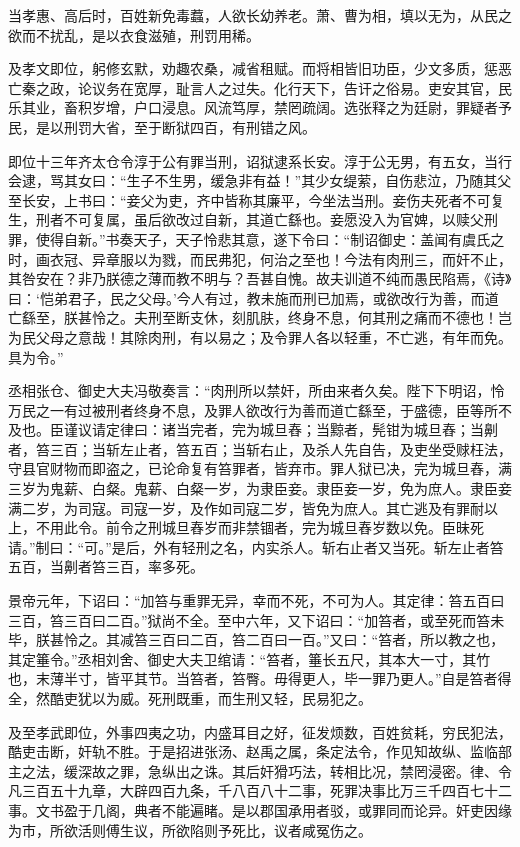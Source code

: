 \documentclass[12pt,UTF8]{ctexbook}
\begin{document}
当孝惠、高后时，百姓新免毒蠚，人欲长幼养老。萧、曹为相，填以无为，从民之欲而不扰乱，是以衣食滋殖，刑罚用稀。



及孝文即位，躬修玄默，劝趣农桑，减省租赋。而将相皆旧功臣，少文多质，惩恶亡秦之政，论议务在宽厚，耻言人之过失。化行天下，告讦之俗易。吏安其官，民乐其业，畜积岁增，户口浸息。风流笃厚，禁罔疏阔。选张释之为廷尉，罪疑者予民，是以刑罚大省，至于断狱四百，有刑错之风。



即位十三年齐太仓令淳于公有罪当刑，诏狱逮系长安。淳于公无男，有五女，当行会逮，骂其女曰：“生子不生男，缓急非有益！”其少女缇萦，自伤悲泣，乃随其父至长安，上书曰：“妾父为吏，齐中皆称其廉平，今坐法当刑。妾伤夫死者不可复生，刑者不可复属，虽后欲改过自新，其道亡繇也。妾愿没入为官婢，以赎父刑罪，使得自新。”书奏天子，天子怜悲其意，遂下令曰：“制诏御史：盖闻有虞氏之时，画衣冠、异章服以为戮，而民弗犯，何治之至也！今法有肉刑三，而奸不止，其咎安在？非乃朕德之薄而教不明与？吾甚自愧。故夫训道不纯而愚民陷焉，《诗》曰：‘恺弟君子，民之父母。’今人有过，教未施而刑已加焉，或欲改行为善，而道亡繇至，朕甚怜之。夫刑至断支休，刻肌肤，终身不息，何其刑之痛而不德也！岂为民父母之意哉！其除肉刑，有以易之；及令罪人各以轻重，不亡逃，有年而免。具为令。”



丞相张仓、御史大夫冯敬奏言：“肉刑所以禁奸，所由来者久矣。陛下下明诏，怜万民之一有过被刑者终身不息，及罪人欲改行为善而道亡繇至，于盛德，臣等所不及也。臣谨议请定律曰：诸当完者，完为城旦舂；当黥者，髡钳为城旦舂；当劓者，笞三百；当斩左止者，笞五百；当斩右止，及杀人先自告，及吏坐受赇枉法，守县官财物而即盗之，已论命复有笞罪者，皆弃市。罪人狱已决，完为城旦舂，满三岁为鬼薪、白粲。鬼薪、白粲一岁，为隶臣妾。隶臣妾一岁，免为庶人。隶臣妾满二岁，为司寇。司寇一岁，及作如司寇二岁，皆免为庶人。其亡逃及有罪耐以上，不用此令。前令之刑城旦舂岁而非禁锢者，完为城旦舂岁数以免。臣昧死请。”制曰：“可。”是后，外有轻刑之名，内实杀人。斩右止者又当死。斩左止者笞五百，当劓者笞三百，率多死。



景帝元年，下诏曰：“加笞与重罪无异，幸而不死，不可为人。其定律：笞五百曰三百，笞三百曰二百。”狱尚不全。至中六年，又下诏曰：“加笞者，或至死而笞未毕，朕甚怜之。其减笞三百曰二百，笞二百曰一百。”又曰：“笞者，所以教之也，其定箠令。”丞相刘舍、御史大夫卫绾请：“笞者，箠长五尺，其本大一寸，其竹也，末薄半寸，皆平其节。当笞者，笞臀。毋得更人，毕一罪乃更人。”自是笞者得全，然酷吏犹以为威。死刑既重，而生刑又轻，民易犯之。



及至孝武即位，外事四夷之功，内盛耳目之好，征发烦数，百姓贫耗，穷民犯法，酷吏击断，奸轨不胜。于是招进张汤、赵禹之属，条定法令，作见知故纵、监临部主之法，缓深故之罪，急纵出之诛。其后奸猾巧法，转相比况，禁罔浸密。律、令凡三百五十九章，大辟四百九条，千八百八十二事，死罪决事比万三千四百七十二事。文书盈于几阁，典者不能遍睹。是以郡国承用者驳，或罪同而论异。奸吏因缘为市，所欲活则傅生议，所欲陷则予死比，议者咸冤伤之。
\end{document}
